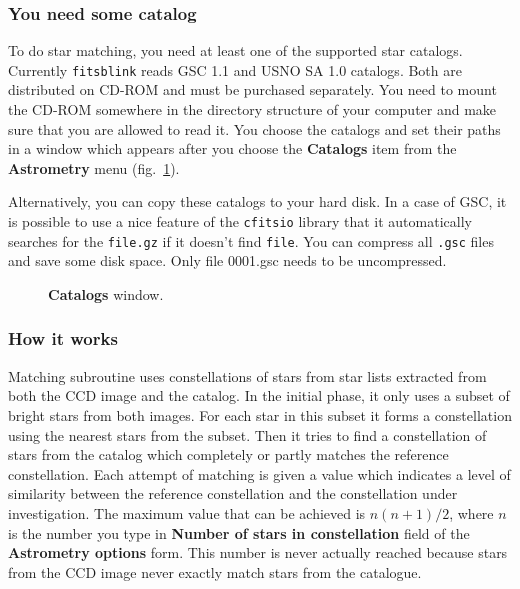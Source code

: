 \documentclass[11pt]{article}
\begin{document}
\subsubsection{You need some catalog}

To do star matching, you need at least one of the supported star
catalogs.  Currently \verb=fitsblink= reads GSC 1.1 and USNO SA 1.0
catalogs.  Both are distributed on CD-ROM and must be purchased
separately.  You need to mount the CD-ROM somewhere in the directory
structure of your computer and make sure that you are allowed to read
it.  You choose the catalogs and set their paths in a window which
appears after you choose the \textbf{Catalogs} item from the
\textbf{Astrometry} menu (fig.~\ref{catalogs}).

Alternatively, you can copy these catalogs to your hard disk.  In a
case of GSC, it is possible to use a nice feature of the
\verb=cfitsio= library that it automatically searches for the
\verb=file.gz= if it doesn't find \verb=file=.  You can compress all
\verb=.gsc= files and save some disk space.  Only file 0001.gsc needs
to be uncompressed.
 
\begin{figure}
\begin{center}
\epsfxsize=8cm
\caption{\textbf{Catalogs} window.}
\label{catalogs}
\end{center}
\end{figure}


\subsubsection{How it works}

Matching subroutine uses constellations of stars from star lists
extracted from both the CCD image and the catalog.  In the initial
phase, it only uses a subset of bright stars from both images.  For
each star in this subset it forms a constellation using the nearest
stars from the subset.  Then it tries to find a constellation of stars
from the catalog which completely or partly matches the reference
constellation.  Each attempt of matching is given a value which
indicates a level of similarity between the reference constellation
and the constellation under investigation.  The maximum value that can
be achieved is $n(n+1)/2$, where $n$ is the number you type in
\textbf{Number of stars in constellation} field of the
\textbf{Astrometry options} form.  This number is never actually
reached because stars from the CCD image never exactly match stars
from the catalogue.
\end{document}
